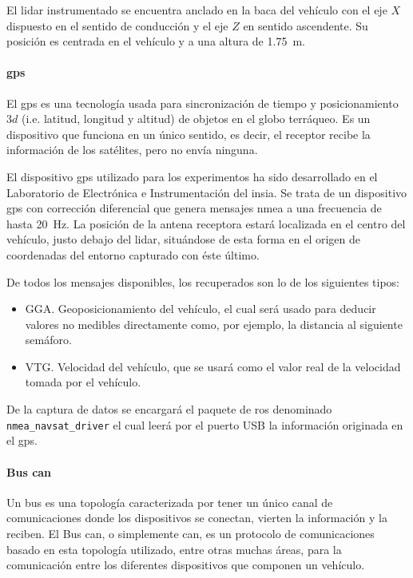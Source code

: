 El \acrshort{lidar} instrumentado se encuentra anclado en la baca del vehículo con el eje $X$ dispuesto en el sentido de conducción y el eje $Z$ en sentido ascendente. Su posición es centrada en el vehículo y a una altura de \SI{1.75}{\meter}.

\paragraph{\Acrshort{gps}}

El \Acrshort{gps} es una tecnología usada para sincronización de tiempo y posicionamiento $3d$ (i.e. latitud, longitud y altitud) de objetos en el globo terráqueo. Es un dispositivo que funciona en un único sentido, es decir, el receptor recibe la información de los satélites, pero no envía ninguna.

El dispositivo \Acrshort{gps} utilizado para los experimentos ha sido desarrollado en el Laboratorio de Electrónica e Instrumentación del \ac{insia}. Se trata de un dispositivo \Acrshort{gps} con corrección diferencial que genera mensajes \ac{nmea} a una frecuencia de hasta \SI{20}{\Hz}. La posición de la antena receptora estará localizada en el centro del vehículo, justo debajo del \acrshort{lidar}, situándose de esta forma en el origen de coordenadas del entorno capturado con éste último.

De todos los mensajes disponibles, los recuperados son lo de los siguientes tipos:

\begin{itemize}
	\item GGA. Geoposicionamiento del vehículo, el cual será usado para deducir valores no medibles directamente como, por ejemplo, la distancia al siguiente semáforo.
	\item VTG. Velocidad del vehículo, que se usará como el valor real de la velocidad tomada por el vehículo.
\end{itemize}

De la captura de datos se encargará el paquete de \ac{ros} denominado \texttt{nmea\_navsat\_driver}  el cual leerá por el puerto USB la información originada en el \Acrshort{gps}.

\paragraph{Bus \Acrshort{can}}

Un bus es una topología caracterizada por tener un único canal de comunicaciones donde los dispositivos se conectan, vierten la información y la reciben. El Bus \Acrshort{can}, o simplemente \Acrshort{can}, es un protocolo de comunicaciones basado en esta topología utilizado, entre otras muchas áreas, para la comunicación entre los diferentes dispositivos que componen un vehículo.

